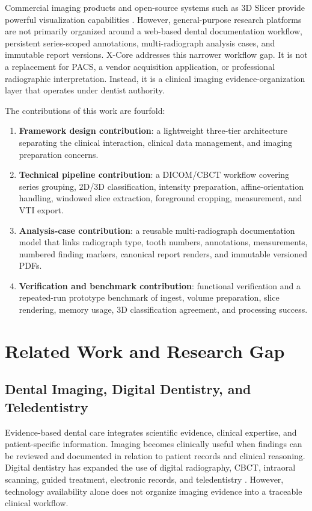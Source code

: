 \documentclass[journal]{IEEEtran}
\begin{document}
Commercial imaging products and open-source systems such as 3D Slicer provide powerful visualization capabilities \cite{ref:fedorov2012}. However, general-purpose research platforms are not primarily organized around a web-based dental documentation workflow, persistent series-scoped annotations, multi-radiograph analysis cases, and immutable report versions. X-Core addresses this narrower workflow gap. It is not a replacement for PACS, a vendor acquisition application, or professional radiographic interpretation. Instead, it is a clinical imaging evidence-organization layer that operates under dentist authority.

The contributions of this work are fourfold:
\begin{enumerate}
\item \textbf{Framework design contribution}: a lightweight three-tier architecture separating the clinical interaction, clinical data management, and imaging preparation concerns.
\item \textbf{Technical pipeline contribution}: a DICOM/CBCT workflow covering series grouping, 2D/3D classification, intensity preparation, affine-orientation handling, windowed slice extraction, foreground cropping, measurement, and VTI export.
\item \textbf{Analysis-case contribution}: a reusable multi-radiograph documentation model that links radiograph type, tooth numbers, annotations, measurements, numbered finding markers, canonical report renders, and immutable versioned PDFs.
\item \textbf{Verification and benchmark contribution}: functional verification and a repeated-run prototype benchmark of ingest, volume preparation, slice rendering, memory usage, 3D classification agreement, and processing success.
\end{enumerate}

\section{Related Work and Research Gap}
\label{sec:related}

\subsection{Dental Imaging, Digital Dentistry, and Teledentistry}

Evidence-based dental care integrates scientific evidence, clinical expertise, and patient-specific information. Imaging becomes clinically useful when findings can be reviewed and documented in relation to patient records and clinical reasoning. Digital dentistry has expanded the use of digital radiography, CBCT, intraoral scanning, guided treatment, electronic records, and teledentistry \cite{ref:eggmann2024,ref:lam2025}. However, technology availability alone does not organize imaging evidence into a traceable clinical workflow.
\end{document}
